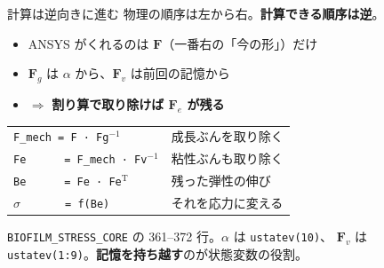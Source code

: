 \documentclass[aspectratio=169,11pt]{beamer}
\begin{document}
\begin{frame}{計算は逆向きに進む}
\small 物理の順序は左から右。\textbf{計算できる順序は逆}。
\vspace{4pt}
\begin{itemize}\small
  \item ANSYS がくれるのは $\bm{F}$（一番右の「今の形」）だけ
  \item $\bm{F}_g$ は $\alpha$ から、$\bm{F}_v$ は前回の記憶から
  \item $\Rightarrow$ \textbf{割り算で取り除けば $\bm{F}_e$ が残る}
\end{itemize}
\vspace{5pt}
\begin{center}
\colorbox{gray!10}{\parbox{0.86\linewidth}{\small
\begin{tabular}{@{}ll@{}}
\texttt{F\_mech = F · Fg$^{-1}$} & 成長ぶんを取り除く \\
\texttt{Fe~~~~~ = F\_mech · Fv$^{-1}$} & 粘性ぶんも取り除く \\
\texttt{Be~~~~~ = Fe · Fe$^{\mathrm{T}}$} & 残った弾性の伸び \\
\texttt{$\sigma$~~~~~~ = f(Be)} & それを応力に変える \\
\end{tabular}}}
\end{center}
\vspace{5pt}
\small \texttt{BIOFILM\_STRESS\_CORE} の 361--372 行。$\alpha$ は \texttt{ustatev(10)}、
$\bm{F}_v$ は \texttt{ustatev(1:9)}。\textbf{記憶を持ち越す}のが状態変数の役割。
\end{frame}
\end{document}
